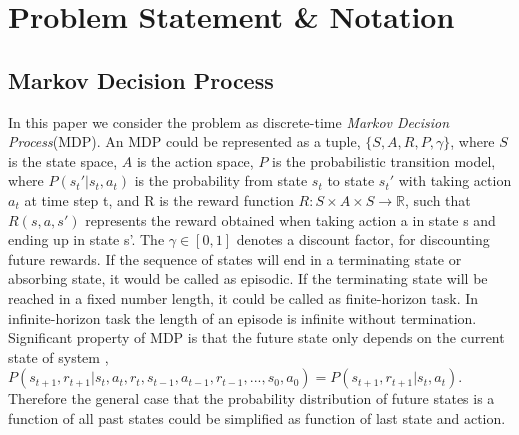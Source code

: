 \section{Problem Statement \& Notation}
\label{sec:problem_state}
\subsection{Markov Decision Process}
\label{sec:problem_MDP}
In this paper we consider the problem as  discrete-time \textit{Markov Decision Process}(MDP).
An MDP could be represented as a tuple, $\{S, A, R, P, \gamma \}$, where $S$ is the state space, $A$ is the action space, $P$ is the probabilistic transition model, where $P(s_t' \vert s_t, a_t)$ is the probability from state $s_t$ to state $s_t '$ with taking action $a_t$ at time step t, and R is the reward function $ R: S \times A \times S \rightarrow \mathbb{R} $, such that $R(s, a, s')$ represents the reward obtained when taking action a in state s and ending up in state s'. The $\gamma \in [0, 1] $  denotes a discount factor, for discounting future rewards. If the sequence of states will end in a terminating state or absorbing state, it would be called as episodic. If the terminating state will be reached in a fixed number length, it could be called as finite-horizon task. In infinite-horizon task the length of an episode is infinite without termination.\\
Significant property of MDP is that the future state only depends on the current state of system \cite{sutton1998introduction},
$
P({s_{t+1}}, r_{t+1} \vert s_t, a_t, r_t, s_{t-1}, a_{t-1}, r_{t-1}, ..., s_0, a_0 ) = P(s_{t+1} , r_{t+1} \vert s_t, a_t)
$.
Therefore the general case that the probability distribution of future states is a function of all past states could be simplified as function of last state and action.
 







